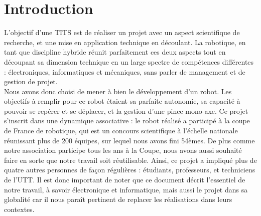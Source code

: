 \chapter{Introduction}
    L’objectif d’une TITS est de réaliser un projet avec un aspect scientifique de recherche, et une mise en application technique en découlant. La robotique, en tant que discipline hybride réunit parfaitement ces deux aspects tout en découpant sa dimension technique en un large spectre de compétences différentes : électroniques, informatiques et mécaniques, sans parler de management et de gestion de projet.\\

    Nous avons donc choisi de mener à bien le développement d’un robot. Les objectifs à remplir pour ce robot étaient sa parfaite autonomie, sa capacité à pouvoir se repérer et se déplacer, et la gestion d’une pince mono-axe. Ce projet s’inscrit dans une dynamique associative : le robot réalisé a participé à la coupe de France de robotique, qui est un concours scientifique à l’échelle nationale réunissant plus de 200 équipes, sur lequel nous avons fini 54èmes. De plus comme notre association participe tous les ans à la Coupe, nous avons aussi souhaité faire en sorte que notre travail soit réutilisable. Ainsi, ce projet a impliqué plus de quatre autres personnes de façon régulières : étudiants, professeurs, et techniciens de l’UTT. Il est donc important de noter que ce document décrit l’essentiel de notre travail, à savoir électronique et informatique, mais aussi le projet dans sa globalité car il nous paraît pertinent de replacer les réalisations dans leurs contextes.